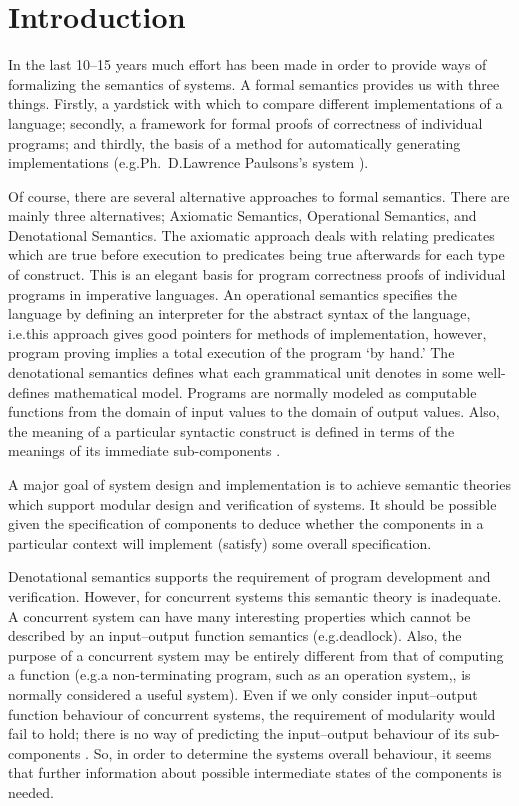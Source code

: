 
\chapter{Introduction}\label{chapIntroduction}

In the last 10--15 years much effort has been made in order to provide ways of formalizing the semantics of systems. A formal semantics provides us with three things. Firstly, a yardstick with which to compare different implementations of a language; secondly, a framework for formal proofs of correctness of individual programs; and thirdly, the basis of a method for automatically generating implementations (e.g.\@ Ph.~D.\@ Lawrence Paulsons's system \cite{Paulson}).

Of course, there are several alternative approaches to formal semantics. There are mainly three alternatives; Axiomatic Semantics, Operational Semantics, and Denotational Semantics. The axiomatic approach deals with relating predicates which are true before execution to predicates being true afterwards for each type of construct. This is an elegant basis for program correctness proofs of individual programs in imperative languages. An operational semantics specifies the language by defining an interpreter for the abstract syntax of the language, i.e.\@ this approach gives good pointers for methods of implementation, however, program proving implies a total execution of the program `by hand.' The denotational semantics defines what each grammatical unit denotes in some well-defines mathematical model. Programs are normally modeled as computable functions from the domain of input values to the domain of output values. Also, the meaning of a particular syntactic construct is defined in terms of the meanings of its immediate sub-components \cite{Gordon}.

A major goal of system design and implementation is to achieve semantic theories which support modular design and verification of systems. It should be possible given the specification of components to deduce whether the components in a particular context will implement (satisfy) some overall specification.

Denotational semantics supports the requirement of program development and verification. However, for concurrent systems this semantic theory is inadequate. A concurrent system can have many interesting properties which cannot be described by an input--output function semantics (e.g.\@ deadlock). Also, the purpose of a concurrent system may be entirely different from that of computing a function (e.g.\@ a non-terminating program, such as an operation system,, is normally considered a useful system). Even if we only consider input--output function behaviour of concurrent systems, the requirement of modularity would fail to hold; there is no way of predicting the input--output behaviour of its sub-components \cite{Larsen}\cite{Milner}. So, in order to determine the systems overall behaviour,  it seems that further information about possible intermediate states of the components is needed.

